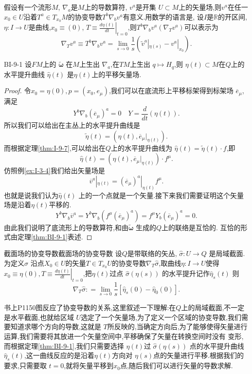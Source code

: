 \documentclass[../main.tex]{subfiles}
\begin{document}
假设有一个流形$M$, $\nabla_a$是$M$上的导数算符, $v^a$是开集 $U \subset M$上的矢量场,则$v^a$在任一 $x_0 \in U$沿着$T^a \in T_{x_0}M$的协变导数$T^b\nabla _b v^a$有意义.用数学的语言是,
设$ I $是$\mathbb{R}$的开区间, $\eta: I\to U$是曲线,$x_0 \equiv(0)$,  $T \equiv \left.\frac{d \eta(t)}{dt}\right|_{t = 0} $,则$T^b \nabla _b v^a(\nabla_T v^a)$可以表示为\[
    \nabla_T v^a \equiv T^b \nabla _b v^a = \lim_{s\to 0} \frac{1}{s}(\tilde{v}^a|_{\eta(s)} - v^a|_{x_0}) 
.\] 
\begin{theorem}
  {}{BI-9-1}
  设$FM$上的 $\bm{\tilde{\omega}} $ 在$M$上生出 $\nabla_a$,在$TM$上生出 $q \mapsto H_q$,则 $\eta(t) \subset M$在$Q$上的水平提升曲线 $\hat{\eta}(t)$ 是$\eta(t)$上的平移矢量场.
\end{theorem}
\begin{proof}
  令$x_0 = \eta(0),p = (x_0,e_\mu)$,我们可以在底流形上平移标架得到标架场 $\overline{e}_\mu$,满足\[
 Y^b \nabla_b (\overline{e}_\mu)^a = 0 \quad Y = \frac{d}{dt}(\eta(t)) 
  .\] 
  所以我们可以给出在主丛上的水平提升曲线是\[
    \tilde{\eta}(t) = (\eta(t) ,\overline{e}_\mu|_{\eta(t)}) 
  .\] 
  而根据定理\ref{thm:I-9-7},可以给出在$Q$上的水平提升曲线为 $\hat{\eta}(t) = \tilde{\eta}(t) \cdot f$,即\[
    \hat{\eta}(t) = (\eta(t),\overline{e}_\mu|_{\eta(t)}) \cdot f^\mu 
  .\] 
  仿照例\ref{ex:I-3-4}我们给出矢量场是\[
    \overline{v}^a|_{\eta(t)} = (\overline{e}_\mu)^a|_{\eta(t)} f^\mu 
  .\] 
  也就是说我们认为$\hat{\eta}(t)$ 上的一个点就是一个矢量.接下来我们需要证明这个矢量场是沿着$\eta(t)$平移的. 
  \[
 Y^b \nabla_b \overline{v}^a = Y^b \nabla_b(f^\mu (\overline{e}_\mu)^a) = f^\mu Y_b (\overline{e}_\mu)^a = 0 
  .\] 
  由此我们说明了底流形上的导数算符,和由$\bm{\tilde{\omega}} $ 生成的$Q$上的联络是互恰的. 互恰的形式由定理\ref{thm:BI-9-1}表述.
\end{proof}
\begin{definition}
  {截面场的协变导数}{截面场的协变导数} 
  设$Q$是带联络的矢丛, $\hat{\sigma}:U\to Q$ 是局域截面.为定义$\hat{\sigma}$ 沿点$X_0 \in U$的矢量$T \in T_{x_0}U$的协变导数$\nabla_T \hat{\sigma}$,取曲线$\eta:I \to U$使得$x_0 \equiv \eta(0), T\equiv \left.\frac{d \eta(t)}{dt}\right|_{t = 0} $,把$\eta(t)$过点 $\hat{\sigma}(\eta(s))$ 的水平提升记作$\hat{\eta}_s(t)$ 则\[
      \nabla_T \hat{\sigma}: =\lim_{s \to 0} \frac{1}{s}[\hat{\eta}_s(0) - \hat{\eta}_0(0)] 
  .\] 
\end{definition}
\begin{note}
  书上P1150图反应了协变导数的关系,这里叙述一下理解:在$Q$上的局域截面,不一定是水平截面,也就给区域 $U$选定了一个矢量场,为了定义一个区域的协变导数,我们需要知道求哪个方向的导数,这就是 $T$所反映的,当确定方向后,为了能够使得矢量进行运算,我们需要将其放进一个矢量空间中,平移确保了矢量在转换空间时没有
  变形,而根据定理\ref{thm:BI-9-1},我们只需要选择 $\eta(t)$过 $\hat{\sigma}(\eta(s))$ 点的水平提升曲线$\hat{\eta}_s(t)$,这一曲线反应的是沿着$\eta(t)$方向对 $\eta(s)$点的矢量进行平移.根据我们的要求,只需要取 $t = 0$,就将矢量平移到$x_0$点,随后我们可以进行矢量的导数求解.
\end{note}
\end{document}
